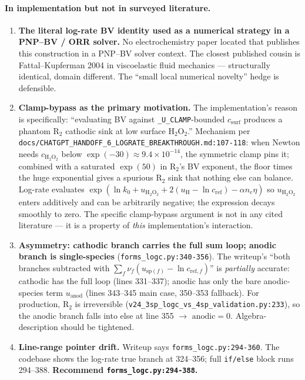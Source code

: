 \documentclass[11pt]{article}
\newcommand{\HtwoOtwo}{\mathrm{H}_2\mathrm{O}_2}
\begin{document}
\paragraph{In implementation but not in surveyed literature.}
\begin{enumerate}
\item \textbf{The literal log-rate BV identity used as a numerical strategy in
      a PNP--BV / ORR solver.} No electrochemistry paper located that
      publishes this construction in a PNP--BV solver context. The closest
      published cousin is Fattal--Kupferman 2004 in viscoelastic fluid
      mechanics --- structurally identical, domain different. The ``small
      local numerical novelty'' hedge is defensible.
\item \textbf{Clamp-bypass as the primary motivation.} The implementation's
      reason is specifically: ``evaluating BV against \texttt{\_U\_CLAMP}-bounded
      $c_{\mathrm{surf}}$ produces a phantom $\mathrm{R}_2$ cathodic sink at
      low surface $\HtwoOtwo$.'' Mechanism per
      \texttt{docs/CHATGPT\_HANDOFF\_6\_LOGRATE\_BREAKTHROUGH.md:107-118}:
      when Newton needs $c_{\HtwoOtwo}$ below $\exp(-30)\approx 9.4\!\times\!10^{-14}$,
      the symmetric clamp pins it; combined with a saturated $\exp(50)$ in
      $\mathrm{R}_2$'s BV exponent, the floor times the huge exponential
      gives a spurious $\mathrm{R}_2$ sink that nothing else can balance.
      Log-rate evaluates
      $\exp(\ln k_0+u_{\HtwoOtwo}+2(u_\mathrm{H}-\ln c_{\mathrm{ref}})-\alpha n_e\eta)$
      so $u_{\HtwoOtwo}$ enters additively and can be arbitrarily negative;
      the expression decays smoothly to zero. The specific clamp-bypass
      argument is not in any cited literature --- it is a property of
      \emph{this} implementation's interaction.
\item \textbf{Asymmetry: cathodic branch carries the full sum loop; anodic
      branch is single-species} (\texttt{forms\_logc.py:340-356}). The
      writeup's ``both branches subtracted with
      $\sum_f \nu_f(u_{\mathrm{sp}(f)}-\ln c_{\mathrm{ref},f})$'' is
      \emph{partially} accurate: cathodic has the full loop (lines 331--337);
      anodic has only the bare anodic-species term $u_{\mathrm{anod}}$
      (lines 343--345 main case, 350--353 fallback). For production,
      $\mathrm{R}_2$ is irreversible
      (\texttt{v24\_3sp\_logc\_vs\_4sp\_validation.py:233}), so the anodic
      branch falls into else at line 355 $\to$ $\mathrm{anodic}=0$.
      Algebra-description should be tightened.
\item \textbf{Line-range pointer drift.} Writeup says
      \texttt{forms\_logc.py:294-360}. The codebase shows the log-rate true
      branch at 324--356; full \texttt{if/else} block runs 294--388.
      \textbf{Recommend \texttt{forms\_logc.py:294-388}.}
\end{enumerate}
\end{document}
